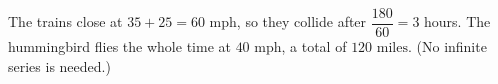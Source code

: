 The trains close at $35+25=60$ mph, so they collide after $\dfrac{180}{60}=3$ hours. The hummingbird flies the whole time at $40$ mph, a total of $\boxed{120\text{ miles}}$. (No infinite series is needed.)

